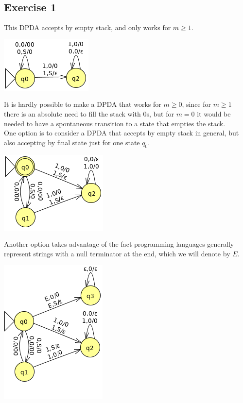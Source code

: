 {\subsection{Exercise 1} \label{TP10_1}
This DPDA accepts by empty stack, and only works for $m \geq 1$.
\begin{center} \includegraphics[scale=0.5]{TP10_1} \end{center}
It is hardly possible to make a DPDA that works for $m \geq 0$, since for $m \geq 1$ there is an absolute need to fill the stack with $0$s, but for $m=0$ it would be needed to have a spontaneous transition to a state that empties the stack.\\
One option is to consider a DPDA that accepts by empty stack in general, but also accepting by final state just for one state $q_0$.
\begin{center} \includegraphics[scale=0.5]{TP10_2} \end{center}
Another option takes advantage of the fact programming languages generally represent strings with a null terminator at the end, which we will denote by $E$.
\begin{center} \includegraphics[scale=0.5]{TP10_3} \end{center}
}

